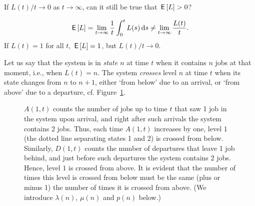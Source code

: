 \begin{exercise}
  If $L(t)/t \to 0$ as $t\to\infty$, can it still be true that $\,\mathsf{E}\left[L\right]>0$? 
  \begin{solution}
    \begin{equation*}
      \,\mathsf{E}\left[L\right] = \lim_{t\to\infty} \frac 1 t \int_0^t L(s) \,\text{d}s \neq \lim_{t\to\infty} \frac{L(t)}t.
    \end{equation*}
If $L(t)=1$ for all $t$, $\,\mathsf{E}\left[L\right] =1 $, but $L(t)/t \to 0$. 
  \end{solution}
\end{exercise}


Let us say that the system is in \emph{state $n$} at time $t$ when it contains $n$
  jobs at that moment, i.e., when $L(t) = n$.  The system \emph{crosses}
level $n$ at time $t$ when its state changes from $n$ to $n+1$, either `from
below' due to an  arrival, or `from above' due to  a departure, cf. Figure~\ref{fig:A_n_t}.

\begin{figure}[th]
  \centering
{}
\caption{ $A(1,t)$ counts the number of jobs up to time $t$ that saw 1
  job in the system upon arrival, and right after such arrivals the
  system contains 2 jobs.  Thus, each time $A(1,t)$ increases by
  one, level $1$ (the dotted line  separating states 1 and 2) is crossed from below.  Similarly, $D(1,t)$ counts the number of
  departures that leave 1 job behind, and just before such departures the system contains 2 jobs. Hence, level $1$ is crossed from above. 
It is evident that the number of times this
  level is crossed from below must be the same (plus or minus 1) the
  number of times it is crossed from above. (We introduce $\lambda(n)$, $\mu(n)$ and $p(n)$ below.) }
\label{fig:A_n_t}
\end{figure}


